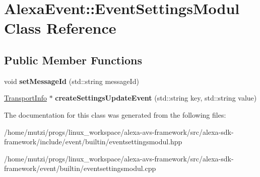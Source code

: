 \hypertarget{classAlexaEvent_1_1EventSettingsModul}{}\section{Alexa\+Event\+:\+:Event\+Settings\+Modul Class Reference}
\label{classAlexaEvent_1_1EventSettingsModul}
\subsection*{Public Member Functions}
\begin{DoxyCompactItemize}
\item 
\mbox{\label{classAlexaEvent_1_1EventSettingsModul_a09657adda9c73bd2da3ef9e1b378d9aa}} 
void {\bfseries set\+Message\+Id} (std\+::string message\+Id)
\item 
\mbox{\label{classAlexaEvent_1_1EventSettingsModul_a14e97437ab7bcc88c786b3e7f4e77cae}} 
\hyperlink{classAlexaEvent_1_1TransportInfo}{Transport\+Info} $\ast$ {\bfseries create\+Settings\+Update\+Event} (std\+::string key, std\+::string value)
\end{DoxyCompactItemize}


The documentation for this class was generated from the following files\+:\begin{DoxyCompactItemize}
\item 
/home/mutzi/progs/linux\+\_\+workspace/alexa-\/avs-\/framework/src/alexa-\/sdk-\/framework/include/event/builtin/eventsettingsmodul.\+hpp\item 
/home/mutzi/progs/linux\+\_\+workspace/alexa-\/avs-\/framework/src/alexa-\/sdk-\/framework/event/builtin/eventsettingsmodul.\+cpp\end{DoxyCompactItemize}
